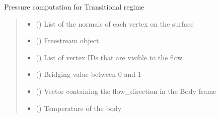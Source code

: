 \documentclass[letterpaper,10pt,english]{sphinxmanual}
\begin{document}

\begin{fulllineitems}
\label{\detokenize{modules:aerothermo.aerodynamics_module_bridging}}
\pysigstartsignatures
{}
\pysigstopsignatures
\sphinxAtStartPar
Pressure computation for Transitional regime
\begin{quote}\begin{description}
\begin{itemize}
\item {} 
\sphinxAtStartPar
{} () \textendash{} List of the normals of each vertex on the surface

\item {} 
\sphinxAtStartPar
{} () \textendash{} Freestream object

\item {} 
\sphinxAtStartPar
{} () \textendash{} List of vertex IDs that are visible to the flow

\item {} 
\sphinxAtStartPar
{} () \textendash{} Bridging value between 0 and 1

\item {} 
\sphinxAtStartPar
{} () \textendash{} Vector containing the flow\_direction in the Body frame

\item {} 
\sphinxAtStartPar
{} () \textendash{} Temperature of the body

\end{itemize}


\end{description}
\end{quote}
\end{fulllineitems}
\end{document}
